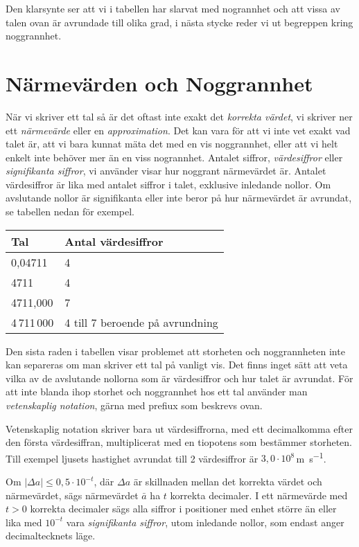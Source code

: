 \bigskip

Den klarsynte ser att vi i tabellen har slarvat med nogrannhet och att
vissa av talen ovan är avrundade till olika grad, i nästa stycke reder
vi ut begreppen kring noggrannhet.

\section{Närmevärden och Noggrannhet}

När vi skriver ett tal så är det oftast inte exakt det \emph{korrekta
värdet}, vi skriver ner ett \emph{närmevärde} eller en
\emph{approximation}.  Det kan vara för att vi inte vet exakt vad
talet är, att vi bara kunnat mäta det med en vis noggrannhet, eller
att vi helt enkelt inte behöver mer än en viss nogrannhet. Antalet
siffror, \emph{värdesiffror} eller \emph{signifikanta siffror}, vi
använder visar hur noggrant närmevärdet är.  Antalet värdesiffror är
lika med antalet siffror i talet, exklusive inledande nollor.  Om
avslutande nollor är signifikanta eller inte beror på hur närmevärdet
är avrundat, se tabellen nedan för exempel.

\bigskip
\begin{centering}
\begin{tabular}{|l|l|}
\hline
Tal & Antal värdesiffror \\
\hline
0,04711 & 4\\
4711 & 4 \\
4711,000 & 7 \\
4\,711\,000 & 4 till 7 beroende på avrundning \\
\hline
\end{tabular}
\end{centering}
\bigskip

Den sista raden i tabellen visar problemet att storheten och
noggrannheten inte kan separeras om man skriver ett tal på vanligt
vis. Det finns inget sätt att veta vilka av de avslutande nollorna som
är värdesiffror och hur talet är avrundat.  För att inte blanda ihop
storhet och noggrannhet hos ett tal använder man \emph{vetenskaplig
notation}, gärna med prefiux som beskrevs ovan.

Vetenskaplig notation skriver bara ut värdesiffrorna, med ett
decimalkomma efter den första värdesiffran, multiplicerat med en
tiopotens som bestämmer storheten. Till exempel ljusets hastighet
avrundat till 2 värdesiffror är $3,0 \cdot 10^8$\,\si{\metre\per\second}.

Om $|\Delta a|\leq 0,5\cdot 10^{-t}$, där $\Delta a$ är skillnaden
mellan det korrekta värdet och närmevärdet, sägs närmevärdet $\bar
{a}$ ha $t$ korrekta decimaler.
I ett närmevärde med $t>0$ korrekta decimaler sägs alla siffror i
positioner med enhet större än eller lika med $10^{-t}$ vara
\emph{signifikanta siffror}, utom inledande nollor, som endast anger
decimaltecknets läge.

